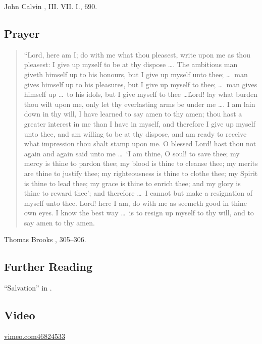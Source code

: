 \documentclass[00-main.tex]{subfiles}
\begin{document}
\begin{flushright}
John Calvin \cite{Calvin:1960}, III. VII. I., 690.
\end{flushright}

\subsection{Prayer}

\begin{quote}
	``Lord, here am I; do with me what thou pleasest, write upon me as thou pleasest: I give up myself to be at thy dispose \dots. The ambitious man giveth himself up to his honours, but I give up myself unto thee; \dots\ man gives himself up to his pleasures, but I give up myself to thee; \dots\ man gives himself up \dots\ to his idols, but I give myself to thee \dots\. Lord! lay what burden thou wilt upon me, only let thy everlasting arms be under me \dots. I am lain down in thy will, I have learned to say amen to thy amen; thou hast a greater interest in me than I have in myself, and therefore I give up myself unto thee, and am willing to be at thy dispose, and am ready to receive what impression thou shalt stamp upon me. O blessed Lord! hast thou not again and again said unto me \dots\ `I am thine, O soul! to save thee; my mercy is thine to pardon thee; my blood is thine to cleanse thee; my merits are thine to justify thee; my righteousness is thine to clothe thee; my Spirit is thine to lead thee; my grace is thine to enrich thee; and my glory is thine to reward thee'; and therefore \dots\ I cannot but make a resignation of myself unto thee. Lord! here I am, do with me as seemeth good in thine own eyes. I know the best way \dots\ is to resign up myself to thy will, and to say amen to thy amen.
\end{quote}

\begin{flushright}
	Thomas Brooks \cite{Brooks:1866}, 305--306.
\end{flushright}

\begin{paracol}{2}
	
\subsection{Further Reading}

``Salvation'' in \cite{Packer:2001}.

\switchcolumn

\subsection{Video}

\href{https://vimeo.com/46824533}{vimeo.com\Slash{}46824533}

\end{paracol}
\end{document}
